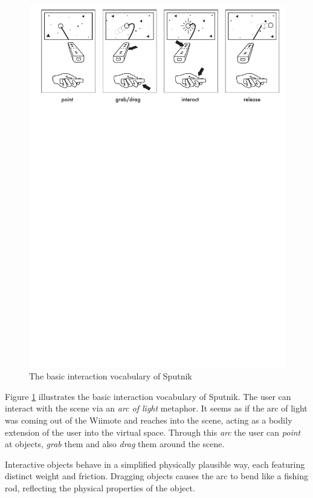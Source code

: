\documentclass[10pt,a4paper]{scrartcl}
\begin{document}
\begin{figure}[hbtp]
\begin{center}
\includegraphics[width=0.95\columnwidth]{img/sputnik-overview}
\caption{The basic interaction vocabulary of Sputnik}
\label{fig:sputnik-overview}
\end{center}
\end{figure}

Figure \ref{fig:sputnik-overview} illustrates the basic interaction vocabulary of Sputnik. The user can interact with the scene via an \emph{arc of light} metaphor. It seems as if the arc of light was coming out of the Wiimote and reaches into the scene, acting as a bodily extension of the user into the virtual space. Through this \emph{arc} the user can \emph{point} at objects, \emph{grab} them and also \emph{drag} them around the scene.

Interactive objects behave in a simplified physically plausible way, each featuring distinct weight and friction. Dragging objects causes the arc to bend like a fishing rod, reflecting the physical properties of the object.
\end{document}
